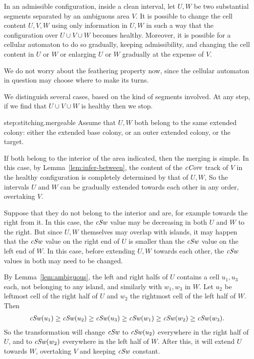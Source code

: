 \documentclass[12pt]{memoir}
\renewcommand{\ge}{\geq}
\newcommand{\fld}[1]{\ensuremath{\textit{#1\/}}}
\newcommand{\cCore}{\fld{cCore}}
\newcommand{\cSweep}{\fld{cSw}}
\begin{document}
\begin{lemma}[Stitching]\label{lem:stitching}
In an admissible configuration, inside a clean interval,
let \( U,W \) be two substantial segments separated by an ambiguous area \( V \).
It is possible to change the cell content \( U,V,W \) using only information in \( U,W \) in such a 
way that the configuration over \( U\cup V\cup W \) becomes healthy.
Moreover, it is possible for a cellular automaton to do so gradually, keeping admissibility, and
changing the cell content in \( U \) or \( W \) or enlarging \( U \) or \( W \) gradually at the expense of \( V \).
\end{lemma}
We do not worry about the feathering property now, since the cellular automaton in question may choose
where to make its turns.
\begin{Proof}
We distinguish several cases, based on the kind of segments involved.
At any step, if we find that \( U\cup V\cup W \) is healthy then we stop.
\begin{step+}{step:stitching.mergeable}
Assume that \( U,W \) both belong to the same extended colony: either the extended base colony, or 
an outer extended colony, or the target.
\end{step+}
\begin{prooof}
If both belong to the interior of the area indicated, then the merging is simple.
In this case, by Lemma~\ref{lem:infer-between}, the content of the \( \cCore \) track 
of \( V \) in the healthy configuration is completely determined by that of \( U,W \),
So the intervals \( U \) and \( W \) can be gradually extended towards each other in any order, 
overtaking \( V \).

Suppose that they do not belong to the interior and are, for example towards the right from it.
In this case, the \( \cSweep \) value may be decreasing in both \( U \) and \( W \) to the right.
But since \( U,W \) themselves may overlap with islands, it may happen that the \( \cSweep \) value
on the right end of \( U \) is smaller than the \( \cSweep \) value on the left end of \( W \).
In this case, before extending \( U,W \) towards each other, the \( \cSweep \) values in both
may need to be changed.

By Lemma~\ref{lem:ambiguous}, the left and right halfs of \( U \) contains a cell \( u_{1},u_{3} \) 
each, not belonging to any island, and similarly with \( w_{1},w_{3} \) in \( W \).
Let \( u_{2} \) be leftmost cell of the right half of \( U \) and \( w_{2} \) the rightmost cell of the left 
half of \( W \).
Then
\begin{align*}
 \cSweep(u_{1})\ge \cSweep(u_{2})\ge \cSweep(u_{3})\ge \cSweep(w_{1})\ge \cSweep(w_{2})\ge \cSweep(w_{3}).   
 \end{align*}
So the transformation will change \( \cSweep \) to \( \cSweep(u_{2}) \) everywhere in the right half of \( U \),
and to \( \cSweep(w_{2}) \) everywhere in the left half of \( W \).
After this, it will extend \( U \) towards \( W \), overtaking \( V \) and keeping \( \cSweep \) constant.


\end{prooof}
\end{Proof}
\end{document}
